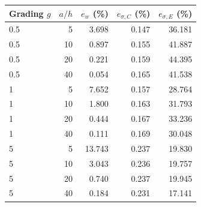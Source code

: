 \begin{tabularx}{\linewidth}{Xrrrr}
\toprule
Grading $g$ & $a/h$ & $e_w$ (\%) & $e_{\sigma,C}$ (\%) & $e_{\sigma,E}$ (\%) \\
\midrule
0.5 & 5 & 3.698 & 0.147 & 36.181 \\
0.5 & 10 & 0.897 & 0.155 & 41.887 \\
0.5 & 20 & 0.221 & 0.159 & 44.395 \\
0.5 & 40 & 0.054 & 0.165 & 41.538 \\
1 & 5 & 7.652 & 0.157 & 28.764 \\
1 & 10 & 1.800 & 0.163 & 31.793 \\
1 & 20 & 0.444 & 0.167 & 33.236 \\
1 & 40 & 0.111 & 0.169 & 30.048 \\
5 & 5 & 13.743 & 0.237 & 19.830 \\
5 & 10 & 3.043 & 0.236 & 19.757 \\
5 & 20 & 0.740 & 0.237 & 19.945 \\
5 & 40 & 0.184 & 0.231 & 17.141 \\
\bottomrule
\end{tabularx}
